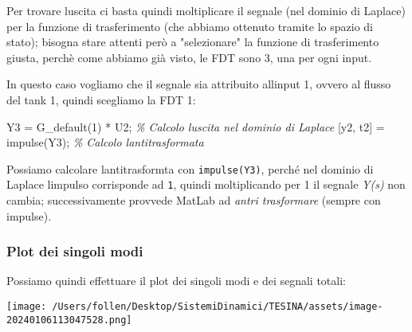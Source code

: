 \documentclass[
]{article}
\newenvironment{Shaded}{}{}
\newcommand{\CommentTok}[1]{\textcolor[rgb]{0.38,0.63,0.69}{\textit{#1}}}
\newcommand{\FloatTok}[1]{\textcolor[rgb]{0.25,0.63,0.44}{#1}}
\newcommand{\NormalTok}[1]{#1}
\newcommand{\OperatorTok}[1]{\textcolor[rgb]{0.40,0.40,0.40}{#1}}
\newcommand{\VariableTok}[1]{\textcolor[rgb]{0.10,0.09,0.49}{#1}}
\begin{document}
Per trovare l\textquotesingle uscita ci basta quindi moltiplicare il
segnale (nel dominio di Laplace) per la funzione di trasferimento (che
abbiamo ottenuto tramite lo spazio di stato); bisogna stare attenti però
a "selezionare" la funzione di trasferimento giusta, perchè come abbiamo
già visto, le FDT sono 3, una per ogni input.

In questo caso vogliamo che il segnale sia attribuito
all\textquotesingle input 1, ovvero al flusso del tank 1, quindi
scegliamo la FDT 1:

\begin{Shaded}
\begin{Highlighting}[]
\VariableTok{Y3} \OperatorTok{=} \VariableTok{G\_default}\NormalTok{(}\FloatTok{1}\NormalTok{) }\OperatorTok{*} \VariableTok{U2}\OperatorTok{;}						\CommentTok{\% Calcolo l\textquotesingle{}uscita nel dominio di Laplace}
\NormalTok{[}\VariableTok{y2}\OperatorTok{,} \VariableTok{t2}\NormalTok{] }\OperatorTok{=} \VariableTok{impulse}\NormalTok{(}\VariableTok{Y3}\NormalTok{)}\OperatorTok{;}						\CommentTok{\% Calcolo l\textquotesingle{}antitrasformata}
\end{Highlighting}
\end{Shaded}

Possiamo calcolare l\textquotesingle antitrasformta con
\texttt{impulse(Y3)}, perché nel dominio di Laplace
l\textquotesingle impulso corrisponde ad \texttt{1}, quindi
moltiplicando per 1 il segnale \emph{Y(s)} non cambia; successivamente
provvede MatLab ad \emph{antri trasformare} (sempre con impulse).

\hypertarget{plot-dei-singoli-modi}{%
\subsubsection{Plot dei singoli modi}\label{plot-dei-singoli-modi}}

Possiamo quindi effettuare il plot dei singoli modi e dei segnali
totali:

\texttt{[image: /Users/follen/Desktop/SistemiDinamici/TESINA/assets/image-20240106113047528.png]}
\end{document}
